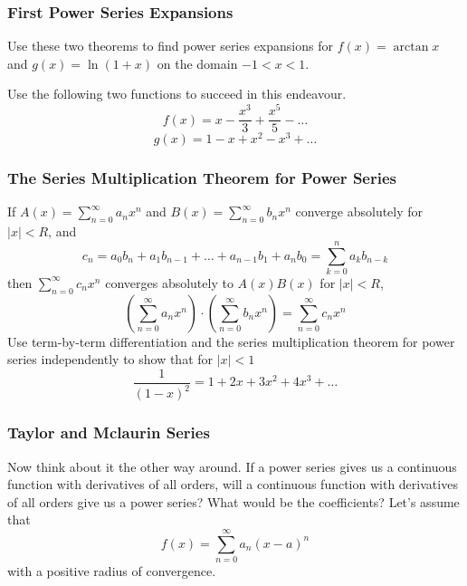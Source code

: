 \documentclass[xcolor=dvipsnames]{beamer}
\begin{document}
\begin{frame}
  \frametitle{First Power Series Expansions}
  Use these two theorems to find power series expansions for $f(x)=\arctan{}x$ and $g(x)=\ln{}(1+x)$ on the domain $-1<x<1$.

  \bigskip

  Use the following two functions to succeed in this endeavour.
  \begin{equation}
    \label{eq:tohpojos}
    f(x)=x-\frac{x^{3}}{3}+\frac{x^{5}}{5}-{\ldots}
  \end{equation}
  \begin{equation}
    \label{eq:queiroxu}
    g(x)=1-x+x^{2}-x^{3}+{\ldots}
  \end{equation}
\end{frame}

\begin{frame}
  \frametitle{The Series Multiplication Theorem for Power Series}
  If $A(x)=\sum_{n=0}^{\infty}a_{n}x^{n}$ and
  $B(x)=\sum_{n=0}^{\infty}b_{n}x^{n}$ converge absolutely for
  $|x|<R$, and
  \begin{equation}
    \label{eq:quewahre}
    c_{n}=a_{0}b_{n}+a_{1}b_{n-1}+{\ldots}+a_{n-1}b_{1}+a_{n}b_{0}=\sum_{k=0}^{n}a_{k}b_{n-k}
  \end{equation}
then $\sum_{n=0}^{\infty}c_{n}x^{n}$ converges absolutely to
$A(x)B(x)$ for $|x|<R$,
\begin{equation}
  \label{eq:axoochid}
  \left(\sum_{n=0}^{\infty}a_{n}x^{n}\right)\cdot\left(\sum_{n=0}^{\infty}b_{n}x^{n}\right)=\sum_{n=0}^{\infty}c_{n}x^{n}
\end{equation}
Use term-by-term differentiation and the series multiplication theorem
for power series independently to show that for $|x|<1$
\begin{equation}
  \label{eq:kahfeipe}
  \frac{1}{(1-x)^{2}}=1+2x+3x^{2}+4x^{3}+{\ldots}
\end{equation}
\end{frame}

\begin{frame}
  \frametitle{Taylor and Mclaurin Series}
  Now think about it the other way around. If a power series gives us
  a continuous function with derivatives of all orders, will a
  continuous function with derivatives of all orders give us a power
  series? What would be the coefficients? Let's assume that
  \begin{equation}
    \label{eq:jeepaipe}
    f(x)=\sum_{n=0}^{\infty}a_{n}(x-a)^{n}
  \end{equation}
  with a positive radius of convergence. 
\end{frame}
\end{document}
